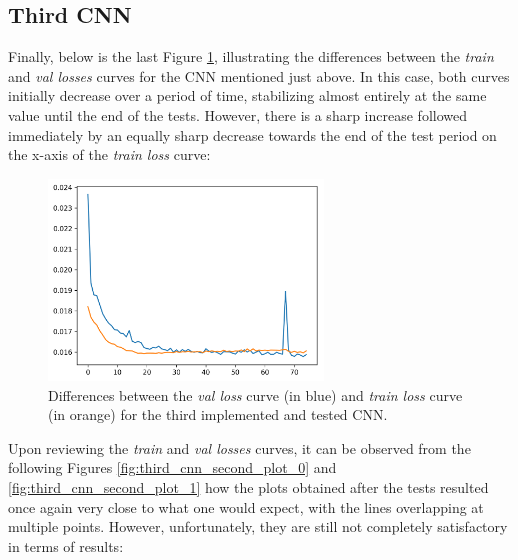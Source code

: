 \documentclass[12pt,english]{report}
\begin{document}
\subsection{Third CNN}
\label{subsec:third_cnn_results}

Finally, below is the last Figure \ref{fig:third_cnn_first_plot}, illustrating the differences between the \textit{train} and \textit{val losses} curves for the CNN mentioned just above. In this case, both curves initially decrease over a period of time, stabilizing almost entirely at the same value until the end of the tests. However, there is a sharp increase followed immediately by an equally sharp decrease towards the end of the test period on the x-axis of the \textit{train loss} curve:

\begin{figure}[H]
    \centering
    \includegraphics[width=0.65\textwidth]{images/third_cnn_first_plot.png}
    \captionsetup{justification=centering}
    \caption{Differences between the \textit{val loss} curve (in blue) and \textit{train loss} curve (in orange) for the third implemented and tested CNN.}
    \label{fig:third_cnn_first_plot}
\end{figure}

Upon reviewing the \textit{train} and \textit{val losses} curves, it can be observed from the following Figures \ref{fig:third_cnn_second_plot_0} and \ref{fig:third_cnn_second_plot_1} how the plots obtained after the tests resulted once again very close to what one would expect, with the lines overlapping at multiple points. However, unfortunately, they are still not completely satisfactory in terms of results:
\end{document}
